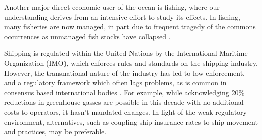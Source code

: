 

Another major direct economic user of the ocean is fishing, where our understanding derives from an intensive effort to study its effects. %
In fishing, many fisheries are now managed, \cite{worm2009rebuilding} in part due to frequent tragedy of the commons occurrences as unmanaged fish stocks have collapsed \cite{costello2012status}. %

  Shipping is regulated within the United Nations by the International Maritime Organization (IMO), which enforces rules and standards on the shipping industry. However, the transnational nature of the industry has led to low enforcement, and a regulatory framework which often lags problems, as is common in consensus based international bodies \cite{cogan2009representation}. %
  For example, while acknowledging 20\% reductions in greenhouse gasses are possible in this decade with no additional costs to operators\cite{imo2009}, it hasn't mandated changes.  In light of the weak regulatory environment, alternatives, such as coupling ship insurance rates to ship movement and practices, may be preferable.


